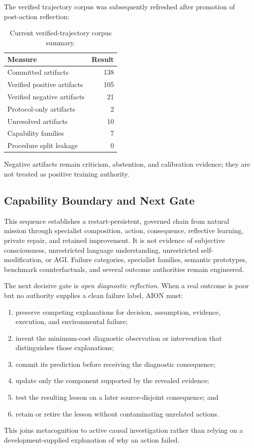 The verified trajectory corpus was subsequently refreshed after promotion of
post-action reflection:
\begin{table}[htbp]
\centering
\caption{Current verified-trajectory corpus summary.}
\label{tab:aion-verified-corpus-current}
\begin{tabular}{@{}lr@{}}
\toprule
Measure & Result \\
\midrule
Committed artifacts & 138 \\
Verified positive artifacts & 105 \\
Verified negative artifacts & 21 \\
Protocol-only artifacts & 2 \\
Unresolved artifacts & 10 \\
Capability families & 7 \\
Procedure split leakage & 0 \\
\bottomrule
\end{tabular}
\end{table}
Negative artifacts remain criticism, abstention, and calibration evidence; they
are not treated as positive training authority.

\subsection{Capability Boundary and Next Gate}

This sequence establishes a restart-persistent, governed chain from natural
mission through specialist composition, action, consequence, reflective
learning, private repair, and retained improvement.  It is not evidence of
subjective consciousness, unrestricted language understanding, unrestricted
self-modification, or AGI.  Failure categories, specialist families, semantic
prototypes, benchmark counterfactuals, and several outcome authorities remain
engineered.

The next decisive gate is \emph{open diagnostic reflection}.  When a real
outcome is poor but no authority supplies a clean failure label, AION must:
\begin{enumerate}
    \item preserve competing explanations for decision, assumption, evidence,
          execution, and environmental failure;
    \item invent the minimum-cost diagnostic observation or intervention that
          distinguishes those explanations;
    \item commit its prediction before receiving the diagnostic consequence;
    \item update only the component supported by the revealed evidence;
    \item test the resulting lesson on a later source-disjoint consequence; and
    \item retain or retire the lesson without contaminating unrelated actions.
\end{enumerate}
This joins metacognition to active causal investigation rather than relying on
a development-supplied explanation of why an action failed.
